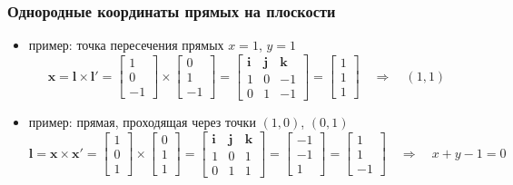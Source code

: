 \documentclass[12pt,usepdftitle=false,aspectratio=1610]{beamer}
\begin{document}
\begin{frame}
\frametitle{Однородные координаты прямых на плоскости}
\begin{itemize}
    \item пример: точка пересечения прямых $x=1$, $y=1$
    $$
        \mathbf{x}=\mathbf{l}\times\mathbf{l'}=
        \begin{bmatrix}
            1\\ 0\\ -1
        \end{bmatrix}
        \times
        \begin{bmatrix}
            0\\ 1\\ -1
        \end{bmatrix}=
        \begin{bmatrix}
            \mathbf{i}& \mathbf{j}& \mathbf{k}\\
            1& 0& -1\\
            0& 1& -1
        \end{bmatrix}=
        \begin{bmatrix}
            1\\ 1\\ 1
        \end{bmatrix}
        \quad\Rightarrow\quad
        (1,1)
    $$
    \item пример: прямая, проходящая через точки $(1,0)$, $(0,1)$
    $$
        \mathbf{l}=\mathbf{x}\times\mathbf{x'}=
        \begin{bmatrix}
            1\\ 0\\ 1
        \end{bmatrix}
        \times
        \begin{bmatrix}
            0\\ 1\\ 1
        \end{bmatrix}=
        \begin{bmatrix}
            \mathbf{i}& \mathbf{j}& \mathbf{k}\\
            1& 0& 1\\
            0& 1& 1
        \end{bmatrix}=
        \begin{bmatrix}
            -1\\ -1\\ 1
        \end{bmatrix}=
        \begin{bmatrix}
            1\\ 1\\ -1
        \end{bmatrix}
        \quad\Rightarrow\quad
        x+y-1=0
    $$
\end{itemize}
\end{frame}
\end{document}
